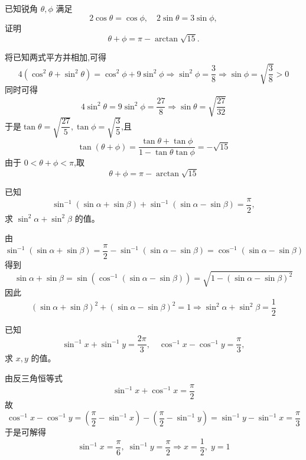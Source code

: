 \begin{questions}
    \question 已知锐角 $\theta,\phi$ 满足
    \[
    2\cos\theta = \cos\phi, \quad 2\sin\theta = 3\sin\phi,
    \]
    证明
    \[
    \theta + \phi = \pi - \arctan \sqrt{15}.
    \]
    \begin{solution}
        将已知两式平方并相加,可得
        \[
        4(\cos^2\theta + \sin^2\theta) = \cos^2\phi + 9\sin^2\phi \Rightarrow \sin^2\phi = \frac{3}{8} \Rightarrow \sin\phi = \sqrt{\frac{3}{8}}>0
        \]
        同时可得
        \[
        4\sin^2\theta = 9\sin^2\phi = \frac{27}{8} \Rightarrow \sin\theta = \sqrt{\frac{27}{32}}
        \]
        于是$\tan\theta =\sqrt{\dfrac{27}{5}},\tan\phi=\sqrt{\dfrac{3}{5}}$,且
        \[
        \tan(\theta+\phi) = \frac{\tan\theta + \tan\phi}{1 - \tan\theta\tan\phi} = -\sqrt{15}
        \]
        由于 $0<\theta+\phi<\pi$,取
        \[
        \theta+\phi = \pi - \arctan\sqrt{15}
        \]
    \end{solution}

    \question 已知
    \[
    \sin^{-1}(\sin\alpha+\sin\beta)+\sin^{-1}(\sin\alpha-\sin\beta)=\frac{\pi}{2},
    \]
    求 $\sin^2\alpha+\sin^2\beta$ 的值。
    \begin{solution}
        由
        \[
        \sin^{-1}(\sin\alpha+\sin\beta)=\frac{\pi}{2}-\sin^{-1}(\sin\alpha-\sin\beta)=\cos^{-1}(\sin\alpha-\sin\beta)
        \]
        得到
        \[
        \sin\alpha+\sin\beta=\sin (\cos^{-1}(\sin\alpha-\sin\beta))=\sqrt{1-(\sin\alpha-\sin\beta)^2}
        \]
        因此
        \[
        (\sin\alpha+\sin\beta)^2+(\sin\alpha-\sin\beta)^2=1 \Rightarrow \sin^2\alpha+\sin^2\beta=\frac{1}{2}
        \]
    \end{solution}

    \question 已知
    \[
    \sin^{-1}x+\sin^{-1}y=\frac{2\pi}{3},\quad
    \cos^{-1}x-\cos^{-1}y=\frac{\pi}{3},
    \]
    求 $x,y$ 的值。
    \begin{solution}
        由反三角恒等式 
        \[
        \sin^{-1}x+\cos^{-1}x=\frac{\pi}{2}
        \]
        故
        \[
        \cos^{-1}x-\cos^{-1}y
        =\left(\frac{\pi}{2}-\sin^{-1}x\right)-\left(\frac{\pi}{2}-\sin^{-1}y\right)
        =\sin^{-1}y-\sin^{-1}x=\frac{\pi}{3}
        \]
        于是可解得
        \[
        \sin^{-1}x=\frac{\pi}{6},\;\sin^{-1}y=\frac{\pi}{2}\Rightarrow x=\frac{1}{2},\;y=1
        \]
    \end{solution}


\end{questions}
